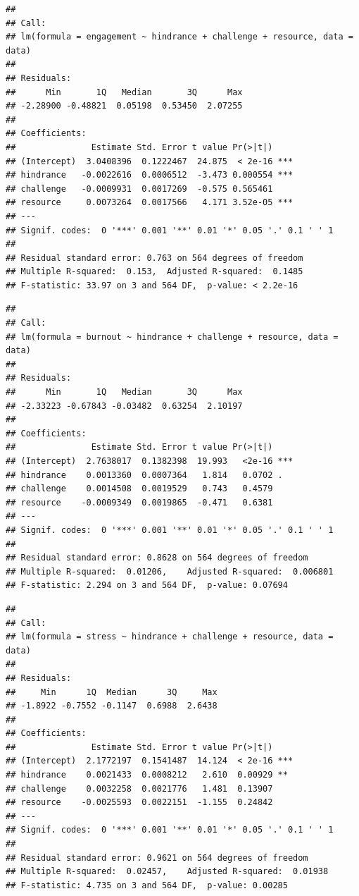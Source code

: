 \documentclass[
  man]{apa6}
\begin{document}
\begin{verbatim}
## 
## Call:
## lm(formula = engagement ~ hindrance + challenge + resource, data = data)
## 
## Residuals:
##      Min       1Q   Median       3Q      Max 
## -2.28900 -0.48821  0.05198  0.53450  2.07255 
## 
## Coefficients:
##               Estimate Std. Error t value Pr(>|t|)    
## (Intercept)  3.0408396  0.1222467  24.875  < 2e-16 ***
## hindrance   -0.0022616  0.0006512  -3.473 0.000554 ***
## challenge   -0.0009931  0.0017269  -0.575 0.565461    
## resource     0.0073264  0.0017566   4.171 3.52e-05 ***
## ---
## Signif. codes:  0 '***' 0.001 '**' 0.01 '*' 0.05 '.' 0.1 ' ' 1
## 
## Residual standard error: 0.763 on 564 degrees of freedom
## Multiple R-squared:  0.153,  Adjusted R-squared:  0.1485 
## F-statistic: 33.97 on 3 and 564 DF,  p-value: < 2.2e-16
\end{verbatim}

\begin{verbatim}
## 
## Call:
## lm(formula = burnout ~ hindrance + challenge + resource, data = data)
## 
## Residuals:
##      Min       1Q   Median       3Q      Max 
## -2.33223 -0.67843 -0.03482  0.63254  2.10197 
## 
## Coefficients:
##               Estimate Std. Error t value Pr(>|t|)    
## (Intercept)  2.7638017  0.1382398  19.993   <2e-16 ***
## hindrance    0.0013360  0.0007364   1.814   0.0702 .  
## challenge    0.0014508  0.0019529   0.743   0.4579    
## resource    -0.0009349  0.0019865  -0.471   0.6381    
## ---
## Signif. codes:  0 '***' 0.001 '**' 0.01 '*' 0.05 '.' 0.1 ' ' 1
## 
## Residual standard error: 0.8628 on 564 degrees of freedom
## Multiple R-squared:  0.01206,    Adjusted R-squared:  0.006801 
## F-statistic: 2.294 on 3 and 564 DF,  p-value: 0.07694
\end{verbatim}

\begin{verbatim}
## 
## Call:
## lm(formula = stress ~ hindrance + challenge + resource, data = data)
## 
## Residuals:
##     Min      1Q  Median      3Q     Max 
## -1.8922 -0.7552 -0.1147  0.6988  2.6438 
## 
## Coefficients:
##               Estimate Std. Error t value Pr(>|t|)    
## (Intercept)  2.1772197  0.1541487  14.124  < 2e-16 ***
## hindrance    0.0021433  0.0008212   2.610  0.00929 ** 
## challenge    0.0032258  0.0021776   1.481  0.13907    
## resource    -0.0025593  0.0022151  -1.155  0.24842    
## ---
## Signif. codes:  0 '***' 0.001 '**' 0.01 '*' 0.05 '.' 0.1 ' ' 1
## 
## Residual standard error: 0.9621 on 564 degrees of freedom
## Multiple R-squared:  0.02457,    Adjusted R-squared:  0.01938 
## F-statistic: 4.735 on 3 and 564 DF,  p-value: 0.00285
\end{verbatim}
\end{document}
